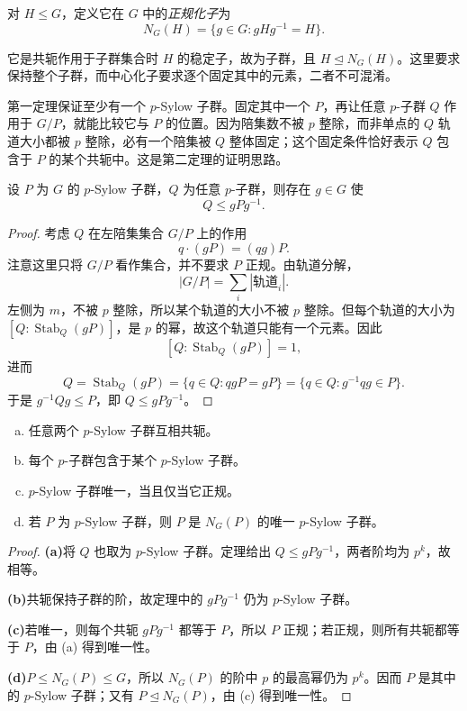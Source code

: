 \documentclass[lang=cn,a4paper,fontset=none,zihao=false,10pt,openany,twoside]{beautybook}
\numberwithin{algorithm}{chapter}
\begin{document}
\begin{definition}[正规化子]
对 $H\le G$，定义它在 $G$ 中的\emph{正规化子}为
\[
 N_G(H)=\{g\in G:gHg^{-1}=H\}.
\]
\end{definition}
它是共轭作用于子群集合时 $H$ 的稳定子，故为子群，且 $H\trianglelefteq N_G(H)$。这里要求保持整个子群，而中心化子要求逐个固定其中的元素，二者不可混淆。

第一定理保证至少有一个 $p$-Sylow 子群。固定其中一个 $P$，再让任意 $p$-子群 $Q$ 作用于 $G/P$，就能比较它与 $P$ 的位置。因为陪集数不被 $p$ 整除，而非单点的 $Q$ 轨道大小都被 $p$ 整除，必有一个陪集被 $Q$ 整体固定；这个固定条件恰好表示 $Q$ 包含于 $P$ 的某个共轭中。这是第二定理的证明思路。
\begin{theorem}\label{thm:sylow-conjugacy}
设 $P$ 为 $G$ 的 $p$-Sylow 子群，$Q$ 为任意 $p$-子群，则存在 $g\in G$ 使
\[
 Q\le gPg^{-1}.
\]
\end{theorem}
\begin{proof}
考虑 $Q$ 在左陪集集合 $G/P$ 上的作用
\[
 q\cdot(gP)=(qg)P.
\]
注意这里只将 $G/P$ 看作集合，并不要求 $P$ 正规。由轨道分解，
\[
 |G/P|=\sum_i|\text{轨道}_i|.
\]
左侧为 $m$，不被 $p$ 整除，所以某个轨道的大小不被 $p$ 整除。但每个轨道的大小为 $[Q:\operatorname{Stab}_Q(gP)]$，是 $p$ 的幂，故这个轨道只能有一个元素。因此
\[
 [Q:\operatorname{Stab}_Q(gP)]=1,
\]
进而
\[
 Q=\operatorname{Stab}_Q(gP)
   =\{q\in Q:qgP=gP\}
   =\{q\in Q:g^{-1}qg\in P\}.
\]
于是 $g^{-1}Qg\le P$，即 $Q\le gPg^{-1}$。
\end{proof}
\begin{corollary}\label{cor:sylow-normalizer}
\begin{enumerate}[(a)]
\item 任意两个 $p$-Sylow 子群互相共轭。
\item 每个 $p$-子群包含于某个 $p$-Sylow 子群。
\item $p$-Sylow 子群唯一，当且仅当它正规。
\item 若 $P$ 为 $p$-Sylow 子群，则 $P$ 是 $N_G(P)$ 的唯一 $p$-Sylow 子群。
\end{enumerate}
\end{corollary}
\begin{proof}
\par\smallskip\noindent\textbf{(a)}\quad 将 $Q$ 也取为 $p$-Sylow 子群。定理给出 $Q\le gPg^{-1}$，两者阶均为 $p^k$，故相等。
\par\smallskip\noindent\textbf{(b)}\quad 共轭保持子群的阶，故定理中的 $gPg^{-1}$ 仍为 $p$-Sylow 子群。
\par\smallskip\noindent\textbf{(c)}\quad 若唯一，则每个共轭 $gPg^{-1}$ 都等于 $P$，所以 $P$ 正规；若正规，则所有共轭都等于 $P$，由 (a) 得到唯一性。
\par\smallskip\noindent\textbf{(d)}\quad $P\le N_G(P)\le G$，所以 $N_G(P)$ 的阶中 $p$ 的最高幂仍为 $p^k$。因而 $P$ 是其中的 $p$-Sylow 子群；又有 $P\trianglelefteq N_G(P)$，由 (c) 得到唯一性。
\end{proof}
\end{document}
